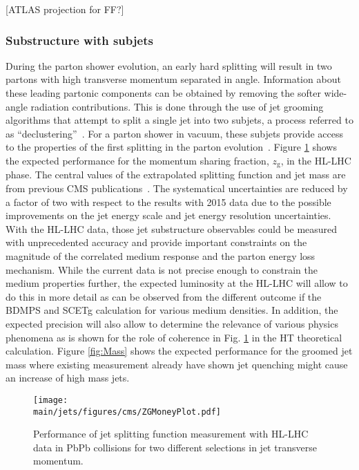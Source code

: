 [ATLAS projection for FF?]


\subsubsection{Substructure with subjets}
During the parton shower evolution, an early hard splitting will result in two partons with high transverse momentum separated in angle. Information about these leading partonic components can be obtained by removing the softer wide-angle radiation contributions. This is done through the use of jet grooming algorithms that attempt to split a single jet into two subjets, a process referred to as ``declustering''~\cite{Ellis:2009me,Butterworth:2008iy,Krohn:2009th,Dasgupta:2013ihk,Larkoski:2014wba}. For a parton shower in vacuum, these subjets provide access to the properties of the first splitting in the parton evolution~\cite{Altarelli:1977zs,Larkoski:2015lea}. Figure \ref{fig:ZG} shows the expected performance for the momentum sharing fraction, $z_{\mathrm{g}}$, in the HL-LHC phase. The central values of the extrapolated splitting function and jet mass are from previous CMS publications~\cite{Sirunyan:2017bsd,Sirunyan:2018gct}. The systematical uncertainties are reduced by a factor of two with respect to the results with 2015 data due to the possible improvements on the jet energy scale and jet energy resolution uncertainties. With the HL-LHC data, those jet substructure observables could be measured with unprecedented accuracy and provide important constraints on the magnitude of the correlated medium response and the parton energy loss mechanism. While the current data is not precise enough to constrain the medium properties further, the expected luminosity at the HL-LHC will allow to do this in more detail as can be observed from the different outcome if the BDMPS and SCETg calculation for various medium densities. In addition, the expected precision will also allow to determine the relevance of various physics phenomena as is shown for the role of coherence in Fig. \ref{fig:ZG} in the HT theoretical calculation. Figure \ref{fig:Mass} shows the expected performance for the groomed jet mass where existing measurement already have shown jet quenching might cause an increase of high mass jets.
\begin{figure}[!ht]
\begin{center}
\texttt{[image: \\main/jets/figures/cms/ZGMoneyPlot.pdf]}
\caption{Performance of jet splitting function measurement with HL-LHC data in PbPb collisions for two different selections in jet transverse momentum. \cite{CMS-FTR-17-002:2017dec}}
\label{fig:ZG}
\end{center}
\end{figure}
